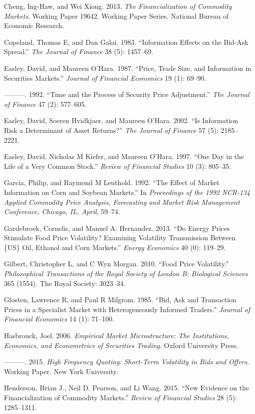 \documentclass[review,12pt]{elsarticle}
\begin{document}
\begin{linenumbers}
Cheng, Ing-Haw, and Wei Xiong. 2013. \emph{The Financialization of
Commodity Markets}. Working Paper 19642. Working Paper Series. National
Bureau of Economic Research.

Copeland, Thomas E, and Dan Galai. 1983. ``Information Effects on the
Bid-Ask Spread.'' \emph{The Journal of Finance} 38 (5): 1457--69.

Easley, David, and Maureen O'Hara. 1987. ``Price, Trade Size, and
Information in Securities Markets.'' \emph{Journal of Financial
Economics} 19 (1): 69--90.

---------. 1992. ``Time and the Process of Security Price Adjustment.''
\emph{The Journal of Finance} 47 (2): 577--605.

Easley, David, Soeren Hvidkjaer, and Maureen O'Hara. 2002. ``Is
Information Risk a Determinant of Asset Returns?'' \emph{The Journal of
Finance} 57 (5): 2185--2221.

Easley, David, Nicholas M Kiefer, and Maureen O'Hara. 1997. ``One Day in
the Life of a Very Common Stock.'' \emph{Review of Financial Studies} 10
(3): 805--35.

Garcia, Philip, and Raymond M Leuthold. 1992. ``The Effect of Market
Information on Corn and Soybean Markets.'' In \emph{Proceedings of the
1992 NCR-134 Applied Commodity Price Analysis, Forecasting and Market
Risk Management Conference, Chicago, IL, April}, 59--74.

Gardebroek, Cornelis, and Manuel A. Hernandez. 2013. ``Do Energy Prices
Stimulate Food Price Volatility? Examining Volatility Transmission
Between \{US\} Oil, Ethanol and Corn Markets.'' \emph{Energy Economics}
40 (0): 119--29.

Gilbert, Christopher L, and C Wyn Morgan. 2010. ``Food Price
Volatility.'' \emph{Philosophical Transactions of the Royal Society of
London B: Biological Sciences} 365 (1554). The Royal Society: 3023--34.

Glosten, Lawrence R, and Paul R Milgrom. 1985. ``Bid, Ask and
Transaction Prices in a Specialist Market with Heterogeneously Informed
Traders.'' \emph{Journal of Financial Economics} 14 (1): 71--100.

Hasbrouck, Joel. 2006. \emph{Empirical Market Microstructure: The
Institutions, Economics, and Econometrics of Securities Trading}. Oxford
University Press.

---------. 2015. \emph{High Frequency Quoting: Short-Term Volatility in
Bids and Offers}. Working Paper. New York University.

Henderson, Brian J., Neil D. Pearson, and Li Wang. 2015. ``New Evidence
on the Financialization of Commodity Markets.'' \emph{Review of
Financial Studies} 28 (5): 1285--1311.


\end{linenumbers}
\end{document}
